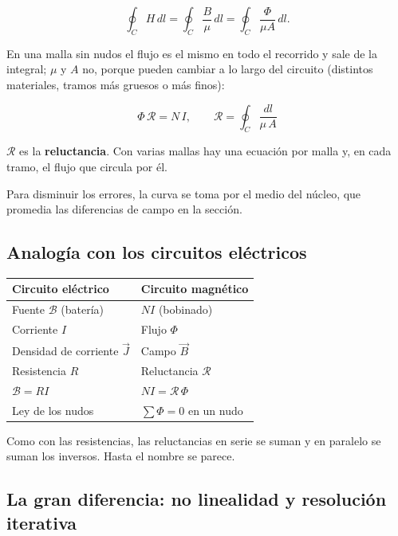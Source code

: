 \documentclass[12pt,a4paper]{article}
\begin{document}
\[
\oint_C H\,dl = \oint_C \frac{B}{\mu}\,dl = \oint_C \frac{\Phi}{\mu A}\,dl .
\]

En una malla sin nudos el flujo es el mismo en todo el recorrido y sale de la
integral; $\mu$ y $A$ no, porque pueden cambiar a lo largo del circuito
(distintos materiales, tramos más gruesos o más finos):

\begin{keybox}
\[
\boxed{\ \Phi\,\mathcal{R} = N\,I,\qquad
\mathcal{R} = \oint_C \frac{dl}{\mu\,A}\ }
\]
\end{keybox}

$\mathcal{R}$ es la \textbf{reluctancia}. Con varias mallas hay una ecuación por
malla y, en cada tramo, el flujo que circula por él.

\begin{notebox}
Para disminuir los errores, la curva se toma por el medio del núcleo, que
promedia las diferencias de campo en la sección.
\end{notebox}

\subsection{Analogía con los circuitos eléctricos}

\begin{center}
\renewcommand{\arraystretch}{1.35}
\small
\begin{tabularx}{\textwidth}{>{\raggedright\arraybackslash}X>{\raggedright\arraybackslash}X}
\toprule
\textbf{Circuito eléctrico} & \textbf{Circuito magnético} \\
\midrule
Fuente $\mathcal{B}$ (batería) & $N I$ (bobinado) \\
Corriente $I$ & Flujo $\Phi$ \\
Densidad de corriente $\vec J$ & Campo $\vec B$ \\
Resistencia $R$ & Reluctancia $\mathcal{R}$ \\
$\mathcal{B} = R I$ & $N I = \mathcal{R}\,\Phi$ \\
Ley de los nudos & $\sum\Phi = 0$ en un nudo \\
\bottomrule
\end{tabularx}
\end{center}

Como con las resistencias, las reluctancias en serie se suman y en paralelo se
suman los inversos. Hasta el nombre se parece.

\subsection{La gran diferencia: no linealidad y resolución iterativa}
\end{document}
